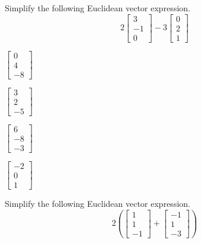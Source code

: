 \documentclass{article}
\begin{document}
\begin{readinessAssuranceTest}

\setcounter{enumi}{10}
\item Simplify the following Euclidean vector expression.
  \[
  2
  \begin{bmatrix}
    3 \\ -1 \\ 0
  \end{bmatrix}-
  3
  \begin{bmatrix}
    0 \\ 2 \\ 1
  \end{bmatrix}
  \]

\begin{multicols}{4}
\begin{readinessAssuranceTestChoices}
\item \(
        \begin{bmatrix}
          0 \\ 4 \\ -8
        \end{bmatrix}
      \)
\item \(
        \begin{bmatrix}
          3 \\ 2 \\ -5
        \end{bmatrix}
      \)
\item \(
        \begin{bmatrix}
          6 \\ -8 \\ -3
        \end{bmatrix}
      \) %
\item \(
        \begin{bmatrix}
          -2 \\ 0 \\ 1
        \end{bmatrix}
      \)
\end{readinessAssuranceTestChoices}
\end{multicols}

\item Simplify the following Euclidean vector expression.
  \[
  2\left(
  \begin{bmatrix}
    1 \\ 1 \\ -1
  \end{bmatrix}+
  \begin{bmatrix}
    -1 \\ 1 \\ -3
  \end{bmatrix}\right)
  \]


\end{readinessAssuranceTest}
\end{document}
